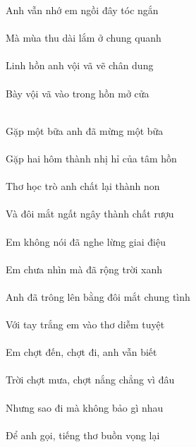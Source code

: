 \documentclass[14pt,a4paper]{extarticle}
\begin{document}
Anh vẫn nhớ em ngồi đây tóc ngắn\\[1ex]
{\huge \ANH{}\em{}}\\[1ex]
Mà mùa thu dài lắm ở chung quanh\\[1ex]
{\huge {}\thu{}\ở\chung\quanh}\\[1ex]
Linh hồn anh vội vã vẽ chân dung\\[1ex]
{\huge \linh{}\ANH{}\dung}\\[1ex]
Bày vội vã vào trong hồn mở cửa\\[1ex] \medskip 
{\huge {}\trong{}}\\[1ex] \medskip 

Gặp một bữa anh đã mừng một bữa\\[1ex]
{\huge {}\ANH{}}\\[1ex]
Gặp hai hôm thành nhị hỉ của tâm hồn\\[1ex]
{\huge {}\hai{}  }\\[1ex]
Thơ học trò anh chất lại thành non\\[1ex]
{\huge {}\ANH{}\non}\\[1ex]
Và đôi mắt ngất ngây thành chất rượu\\[1ex]
{\huge {}}\\[1ex]

Em không nói đã nghe lừng giai điệu\\[1ex]
{\huge \em{}\nghe{}\giai{}}\\[1ex]
Em chưa nhìn mà đã rộng trời xanh\\[1ex]
{\huge \em{}\xanh}\\[1ex]
Anh đã trông lên bằng đôi mắt chung tình\\[1ex]
{\huge \ANH{}\chung {}}\\[1ex]
Với tay trắng em vào thơ diễm tuyệt\\[1ex]
{\huge {}\tay{}\em{}}\\[1ex]

Em chợt đến, chợt đi, anh vẫn biết\\[1ex]
{\huge \em{}\ANH{}}\\[1ex]
Trời chợt mưa, chợt nắng chẳng vì đâu\\[1ex]
{\huge {}}\\[1ex]
Nhưng sao đi mà không bảo gì nhau\\[1ex]
{\huge {}\sao{}\nhau}\\[1ex]
Để anh gọi, tiếng thơ buồn vọng lại\\[1ex]
{\huge {}\ANH{}}\\[1ex]
\end{document}
